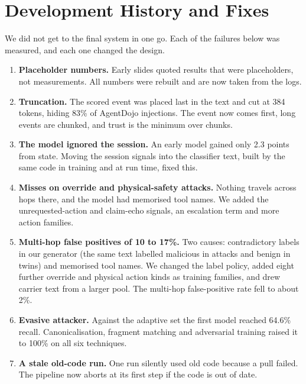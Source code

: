 \section{Development History and Fixes}
\label{sec:history}
We did not get to the final system in one go. Each of the failures below was measured, and each one changed the design.
\begin{enumerate}
\item \textbf{Placeholder numbers.} Early slides quoted results that were placeholders, not measurements. All numbers were rebuilt and are now taken from the logs.
\item \textbf{Truncation.} The scored event was placed last in the text and cut at 384 tokens, hiding 83\% of AgentDojo injections. The event now comes first, long events are chunked, and trust is the minimum over chunks.
\item \textbf{The model ignored the session.} An early model gained only 2.3 points from state. Moving the session signals into the classifier text, built by the same code in training and at run time, fixed this.
\item \textbf{Misses on override and physical-safety attacks.} Nothing travels across hops there, and the model had memorised tool names. We added the unrequested-action and claim-echo signals, an escalation term and more action families.
\item \textbf{Multi-hop false positives of 10 to 17\%.} Two causes: contradictory labels in our generator (the same text labelled malicious in attacks and benign in twins) and memorised tool names. We changed the label policy, added eight further override and physical action kinds as training families, and drew carrier text from a larger pool. The multi-hop false-positive rate fell to about 2\%.
\item \textbf{Evasive attacker.} Against the adaptive set the first model reached 64.6\% recall. Canonicalisation, fragment matching and adversarial training raised it to 100\% on all six techniques.
\item \textbf{A stale old-code run.} One run silently used old code because a pull failed. The pipeline now aborts at its first step if the code is out of date.
\end{enumerate}
